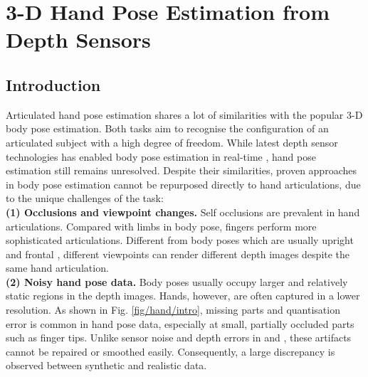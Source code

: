 \chapter{3-D Hand Pose Estimation from Depth Sensors}
\label{chap/hand}

\section{Introduction}
Articulated hand pose estimation shares a lot of similarities with the popular 3-D body pose estimation. 
Both tasks aim to recognise the configuration of an articulated subject with a high degree of freedom. 
While latest depth sensor technologies has enabled body pose estimation in real-time \cite{Baak2011, Shotton2011, Girshick2011, Sun2012}, hand pose estimation still remains unresolved.
Despite their similarities, proven approaches in body pose estimation cannot be repurposed directly to hand articulations, due to the unique challenges of the task:   \\
\textbf{(1) Occlusions and viewpoint changes.} Self occlusions are prevalent in hand articulations. %
Compared with limbs in body pose, fingers perform more sophisticated articulations. 
Different from body poses which are usually upright and frontal \cite{Eichner2012}, different viewpoints can render different depth images despite the same hand articulation. \\  
\textbf{(2) Noisy hand pose data.} Body poses usually occupy larger and relatively static regions in the depth images. 
Hands, however, are often captured in a lower resolution.
As shown in Fig. \ref{fig/hand/intro}, missing parts and quantisation error is common in hand pose data, especially at small, partially occluded parts such as finger tips. 
Unlike sensor noise and depth errors in \cite{Girshick2011} and \cite{Baak2011}, these artifacts cannot be repaired or smoothed easily. Consequently, a large discrepancy is observed between synthetic and realistic data. 

